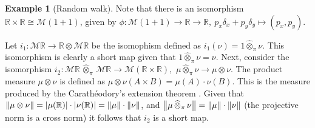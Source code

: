 \documentclass[10pt,a4paper]{amsart}
\theoremstyle{definition}
\theoremstyle{definition}
\newtheorem{example}[definition]{Example}
\theoremstyle{definition}
\theoremstyle{definition}
\theoremstyle{definition}
\theoremstyle{definition}
\begin{document}
\begin{example}[Random walk]
    Note that there is an isomorphism $ \mathbb{R} \times \mathbb{R}  \cong \mathcal{M}(1+1)$, given by $\phi: \mathcal{M}(1+1) \to \mathbb{R} \to \mathbb{R}  ,\ p_x \delta_x + p_y \delta_y  \mapsto (p_x, p_y)$. 

  


    


    

    Let $i_1: \mathcal{M}\mathbb{R}  \to \mathbb{R} \otimes \mathcal{M}\mathbb{R}$ be the isomophism defined as $i_1(\nu) = 1  \widehat{\otimes}_{\pi} \nu$. 
    This isomorphism is clearly a short map given that $ 1  \widehat{\otimes}_{\pi} \nu = \nu$. 
    Next, consider the isomorphism $i_2: \mathcal{M}\mathbb{R} \,   \widehat{\otimes}_{\pi} \,   \mathcal{M}\mathbb{R} \to  \mathcal{M} \left( \mathbb{R} \times \mathbb{R} \right),$ 
    $\mu  \widehat{\otimes}_{\pi} \nu \to \mu \otimes \nu.$ 
    The product measure $\mu \otimes \nu$ is defined as $\mu  \otimes \nu (A \times B)= \mu(A)\cdot\nu(B).$
    This is the measure produced by the Carath\'{e}odory's extension theorem \cite{aliprantisBanachLattices1999}.
    Given that $\left\lVert \mu \otimes \nu \right\rVert= |\mu (\mathbb{R})|\cdot |\nu (\mathbb{R})| = \left\lVert \mu \right\rVert \cdot \left\lVert \nu \right\rVert$, and $ \left\lVert \mu \, \widehat{\otimes}_{\pi} \, \nu \right\rVert = \left\lVert \mu \right\rVert \cdot \left\lVert \nu \right\rVert$ (the projective norm is a cross norm) it follows that $i_2$ is a short map.



    \begin{comment}
    Next, consider the following commutative diagram:

    \begin{tikzpicture}
      \matrix (m) [matrix of math nodes, row sep=4em, column sep=6em, minimum width=2em]
      {
         \mathcal{M}\mathbb{R} \,   \widehat{\otimes}_{\pi} \,   \mathcal{M}\mathbb{R} &  \mathcal{M} \left( \mathbb{R} \times \mathbb{R} \right)  \\
        \mathcal{M}\mathbb{R} \times \mathcal{M}\mathbb{R}   \\
      };
      \path[dotted, -stealth]
      (m-2-1) edge node [left] {$\widehat{\otimes}_{\pi}$} (m-1-1);
      \path[-stealth]
        (m-1-1) edge node [above] {$i_2$} (m-1-2)
        (m-2-1) edge node [above] {$f$} (m-1-2)
        ;
    \end{tikzpicture}


\end{comment}
\end{example}
\end{document}

